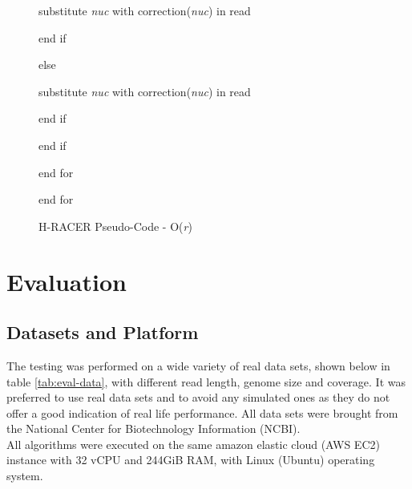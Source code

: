 \documentclass[12pt]{llncs}
\begin{document}
\begin{figure}
\begin{bordered}
\noindent\hspace{18ex}substitute \textit{nuc} with correction(\textit{nuc}) in read

\noindent\hspace{15ex}end if		

\noindent\hspace{12ex}else 

\noindent\hspace{15ex}substitute \textit{nuc} with correction(\textit{nuc}) in read

\noindent\hspace{12ex}end if

\noindent\hspace{9ex}end if

\noindent\hspace{6ex}end for 

\noindent\hspace{3ex}end for 
\end{bordered}
\caption{\label{fig:fig-HRACER-PSC}H-RACER Pseudo-Code - O(\textit{r})}
\end{figure}

\newpage
\chapter{\label{chap:6}Evaluation}
\section{Datasets and Platform}
The testing was performed on a wide variety of real data sets, shown below in table \ref{tab:eval-data}, with different read length, genome size and coverage. It was preferred to use real data sets and to avoid any simulated ones as they do not offer a good indication of real life performance. All data sets were brought from the National Center for Biotechnology Information (NCBI).
\\
All algorithms were executed on the same amazon elastic cloud (AWS EC2) instance with 32 vCPU and 244GiB RAM, with Linux (Ubuntu) operating system.
\end{document}
